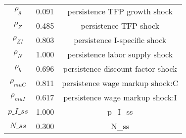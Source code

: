 \begin{center}
\begin{longtable}{ccc}
${\rho_g}$ 	 & 	 0.091 	 & 	 persistence TFP growth shock\\
${\rho_Z}$ 	 & 	 0.485 	 & 	 persistence TFP shock\\
${\rho_{ZI}}$ 	 & 	 0.803 	 & 	 persistence I-specific shock\\
${\rho_N}$ 	 & 	 1.000 	 & 	 persistence labor supply shock\\
${\rho_b}$ 	 & 	 0.696 	 & 	 persistence discount factor shock\\
${\rho_{muC}}$ 	 & 	 0.811 	 & 	 persistence wage markup shock:C\\
${\rho_{muI}}$ 	 & 	 0.617 	 & 	 persistence wage markup shock:I\\
$p\_I\_ss$ 	 & 	 1.000 	 & 	 p\_I\_ss\\
$N\_ss$ 	 & 	 0.300 	 & 	 N\_ss\\
\bottomrule%
\end{longtable}
\end{center}

